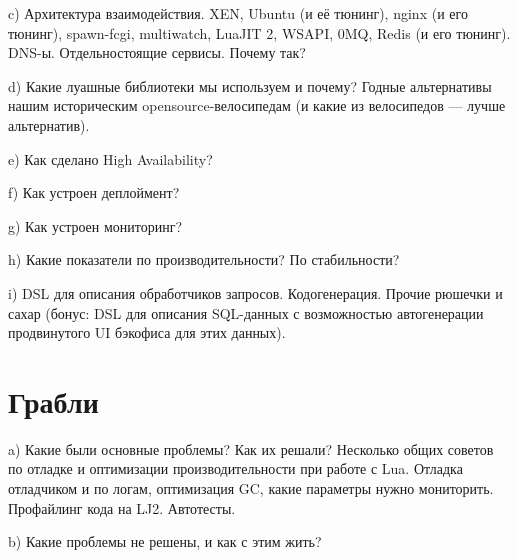 \documentclass[handout]{beamer}
\begin{document}
\begin{frame}
c) Архитектура взаимодействия. XEN, Ubuntu (и её тюнинг), nginx (и его тюнинг), spawn-fcgi, multiwatch, LuaJIT 2, WSAPI, 0MQ, Redis (и его тюнинг). DNS-ы. Отдельностоящие сервисы. Почему так?
\end{frame}

\begin{frame}
d) Какие луашные библиотеки мы используем и почему? Годные альтернативы нашим историческим opensource-велосипедам (и какие из велосипедов — лучше альтернатив).
\end{frame}

\begin{frame}
e) Как сделано High Availability?
\end{frame}

\begin{frame}
f) Как устроен деплоймент?
\end{frame}

\begin{frame}
g) Как устроен мониторинг?
\end{frame}

\begin{frame}
h) Какие показатели по производительности? По стабильности?
\end{frame}

\begin{frame}
i) DSL для описания обработчиков запросов. Кодогенерация. Прочие рюшечки и сахар (бонус: DSL для описания SQL-данных с возможностью автогенерации продвинутого UI бэкофиса для этих данных).
\end{frame}


\section{Грабли}

\begin{frame}
a) Какие были основные проблемы? Как их решали? Несколько общих советов по отладке и оптимизации производительности при работе с Lua. Отладка отладчиком и по логам, оптимизация GC, какие параметры нужно мониторить. Профайлинг кода на LJ2. Автотесты.
\end{frame}

\begin{frame}
b) Какие проблемы не решены, и как с этим жить?
\end{frame}
\end{document}
